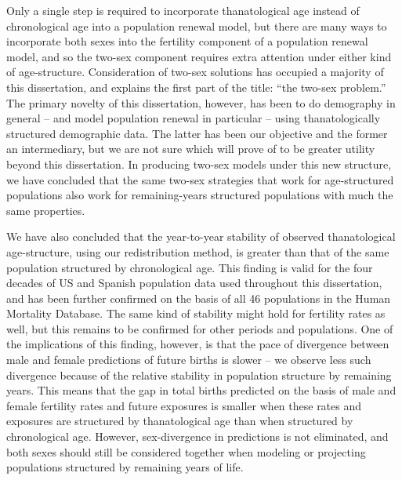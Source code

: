 
Only a single step is required to incorporate thanatological age
instead of chronological age into a population renewal
model, but there are many ways to incorporate both sexes into the fertility
component of a population renewal model, and so the two-sex component 
requires extra attention under either kind of age-structure. Consideration
of two-sex solutions has occupied a majority of this dissertation, and explains the first part of 
the title: ``the two-sex problem.'' The primary
novelty of this dissertation, however, has been to do demography in general --
and model population renewal in particular -- using thanatologically structured
demographic data. The latter has been our objective and the former
an intermediary, but we are not sure which will prove of to be greater utility
beyond this dissertation. In producing
two-sex models under this new structure, we have concluded that the same two-sex 
strategies that work for age-structured populations also work for
remaining-years structured populations with much the same properties.

We have also concluded that the year-to-year stability of observed
thanatological age-structure, using our redistribution method, is
greater than that of the same population structured by
chronological age. This finding is valid for the four decades of US and
Spanish population data used throughout this dissertation, and has been further
confirmed on the basis of all 46 populations in the Human Mortality Database.
The same kind of stability might hold for fertility rates as well, but this
remains to be confirmed for other periods and populations. One of the
implications of this finding, however, is that the pace of divergence between
male and female predictions of future births is slower -- we observe less such
divergence because of the relative stability in population structure by
remaining years. This means that the gap in total births predicted on the basis of male and female 
fertility rates and future exposures is smaller when these rates and exposures 
are structured by thanatological age than when structured by chronological age. However,
sex-divergence in predictions is not eliminated, and both sexes should still
be considered together when modeling or projecting populations structured
by remaining years of life.

